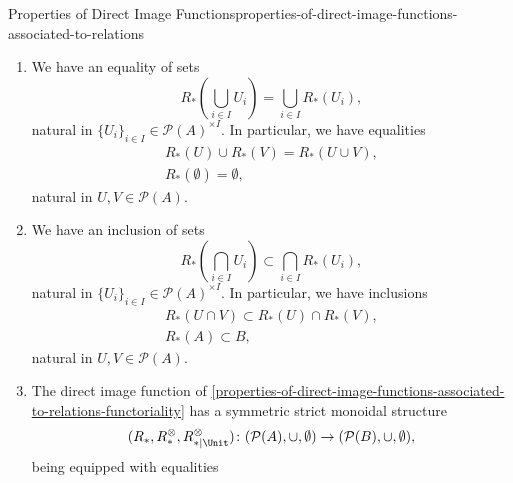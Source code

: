 \begin{proposition}{Properties of Direct Image Functions}{properties-of-direct-image-functions-associated-to-relations}
\begin{enumerate}
\begin{itemize}
\begin{itemize}
                    \end{itemize}%
            \end{itemize}%
        \item\label{properties-of-direct-image-functions-associated-to-relations-preservation-of-colimits}We have an equality of sets
            \[
                R_{*}(\bigcup_{i\in I}U_{i})%
                =%
                \bigcup_{i\in I}R_{*}(U_{i}),%
            \]%
            natural in $\{U_{i}\}_{i\in I}\in\mathcal{P}(A)^{\times I}$. In particular, we have equalities%
            \[
                \begin{gathered}
                    R_{*}(U)\cup R_{*}(V)                  = R_{*}(U\cup V),\\
                    R_{*}(\emptyset)                       = \emptyset,
                \end{gathered}
            \]%
            natural in $U,V\in\mathcal{P}(A)$.
        \item\label{properties-of-direct-image-functions-associated-to-relations-oplax-preservation-of-limits}We have an inclusion of sets
            \[
                R_{*}(\bigcap_{i\in I}U_{i})%
                \subset%
                \bigcap_{i\in I}R_{*}(U_{i}),%
            \]%
            natural in $\{U_{i}\}_{i\in I}\in\mathcal{P}(A)^{\times I}$. In particular, we have inclusions%
            \[
                \begin{gathered}
                    R_{*}(U\cap V) \subset R_{*}(U)\cap R_{*}(V),\\
                    R_{*}(A)       \subset B,
                \end{gathered}
            \]%
            natural in $U,V\in\mathcal{P}(A)$.
        \item\label{properties-of-direct-image-functions-associated-to-relations-symmetric-strict-monoidality-with-respect-to-unions}The direct image function of \cref{properties-of-direct-image-functions-associated-to-relations-functoriality} has a symmetric strict monoidal structure
            \[
                (R_{*},R^{\otimes}_{*},R^{\otimes}_{*|\Unit})
                \colon
                (\mathcal{P}(A),\cup,\emptyset)
                \to
                (\mathcal{P}(B),\cup,\emptyset),
            \]%
            being equipped with equalities%
            \[
                \begin{gathered}

\end{gathered}\]
\end{enumerate}
\end{proposition}
